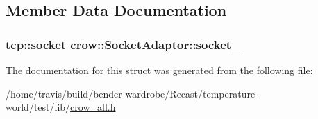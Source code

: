 \subsection{Member Data Documentation}
\hypertarget{structcrow_1_1_socket_adaptor_adfae304955845303cee26c31910b1f2c}{
\subsubsection[{socket\-\_\-}]{\setlength{\rightskip}{0pt plus 5cm}tcp\-::socket crow\-::\-Socket\-Adaptor\-::socket\-\_\-}}\label{structcrow_1_1_socket_adaptor_adfae304955845303cee26c31910b1f2c}


The documentation for this struct was generated from the following file\-:\begin{DoxyCompactItemize}
\item 
/home/travis/build/bender-\/wardrobe/\-Recast/temperature-\/world/test/lib/\hyperlink{crow__all_8h}{crow\-\_\-all.\-h}\end{DoxyCompactItemize}
